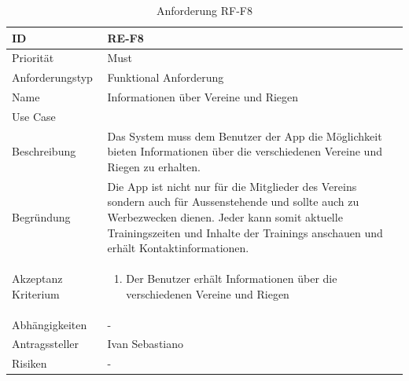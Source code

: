 \begin{table}[ht]
\centering
  \begin{tabular}{ l | p{8cm} }
	\hline
	\rowcolor{gray}
	ID 			&	\textbf{RE-F8}\\ \hline
	Priorität 		&	Must\\ \hline
	Anforderungstyp	&	Funktional Anforderung\\ \hline
	Name 			&	Informationen über Vereine und Riegen\\ \hline
	Use Case 		&	\nameref{table:use_case_6}\\ \hline
	Beschreibung 	&	Das System muss dem Benutzer der App die Möglichkeit bieten Informationen über die verschiedenen Vereine und Riegen zu erhalten.\\ \hline
	Begründung 		&	Die App ist nicht nur für die Mitglieder des Vereins sondern auch für Aussenstehende und sollte auch zu Werbezwecken dienen. Jeder kann somit aktuelle Trainingszeiten und Inhalte der Trainings anschauen und erhält Kontaktinformationen.\\ \hline
	Akzeptanz Kriterium	&	\begin{enumerate}
					\item Der Benutzer erhält Informationen über die verschiedenen Vereine und Riegen
					\end{enumerate}
					\\ \hline
	Abhängigkeiten 	&	-\\ \hline
	Antragssteller 	&	Ivan Sebastiano\\ \hline
	Risiken	 	&	-
  \end{tabular}
   \caption{Anforderung RF-F8}\label{table:req_8}
\end{table}

